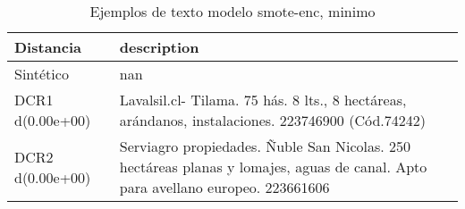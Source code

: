 \begin{table}[H]
\centering
\fontsize{10}{14}\selectfont
\caption{Ejemplos de texto modelo smote-enc, minimo}
\label{table-example-economicos-b-3-smote-enc-min-text}
\begin{tabular}{|l|m{35em}|}
\hline
\rowcolor[gray]{0.8}
Distancia & description \\
\hline Sintético & nan \\
\hline DCR1 d(0.00e+00) & Lavalsil.cl- Tilama. 75 h\'as. 8 lts., 8 hect\'areas, ar\'andanos, instalaciones. 223746900 (C\'od.74242) \\
\hline DCR2 d(0.00e+00) & Serviagro propiedades. \~Nuble San Nicolas. 250 hect\'areas planas y lomajes, aguas de canal. Apto para avellano europeo. 223661606 \\
\hline
\end{tabular}
\end{table}
